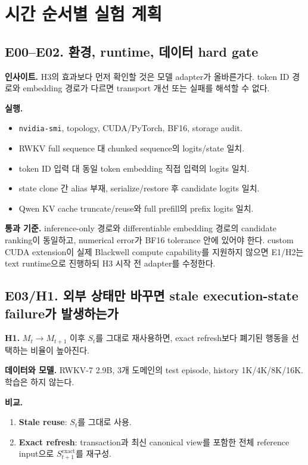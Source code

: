 \documentclass[10.5pt,a4paper]{article}
\newcommand{\code}[1]{\texttt{#1}}
\begin{document}
\section{시간 순서별 실험 계획}

\subsection{E00--E02. 환경, runtime, 데이터 hard gate}

\textbf{인사이트.} H3의 효과보다 먼저 확인할 것은 모델 adapter가 올바른가다. token ID 경로와 embedding 경로가 다르면 transport 개선 또는 실패를 해석할 수 없다.

\textbf{실행.}
\begin{itemize}
\item \code{nvidia-smi}, topology, CUDA/PyTorch, BF16, storage audit.
\item RWKV full sequence 대 chunked sequence의 logits/state 일치.
\item token ID 입력 대 동일 token embedding 직접 입력의 logits 일치.
\item state clone 간 alias 부재, serialize/restore 후 candidate logits 일치.
\item Qwen KV cache truncate/reuse와 full prefill의 prefix logits 일치.
\end{itemize}

\textbf{통과 기준.} inference-only 경로와 differentiable embedding 경로의 candidate ranking이 동일하고, numerical error가 BF16 tolerance 안에 있어야 한다. custom CUDA extension이 실제 Blackwell compute capability를 지원하지 않으면 E1/H2는 text runtime으로 진행하되 H3 시작 전 adapter를 수정한다.

\subsection{E03/H1. 외부 상태만 바꾸면 stale execution-state failure가 발생하는가}

\begin{keybox}
\textbf{H1.} $M_t\to M_{t+1}$ 이후 $S_t$를 그대로 재사용하면, exact refresh보다 폐기된 행동을 선택하는 비율이 높아진다.
\end{keybox}

\textbf{데이터와 모델.} RWKV-7 2.9B, 3개 도메인의 test episode, history 1K/4K/8K/16K. 학습은 하지 않는다.

\textbf{비교.}
\begin{enumerate}
\item \textbf{Stale reuse}: $S_t$를 그대로 사용.
\item \textbf{Exact refresh}: transaction과 최신 canonical view를 포함한 전체 reference input으로 $S_{t+1}^{\mathrm{exact}}$를 재구성.
\end{enumerate}
\end{document}
